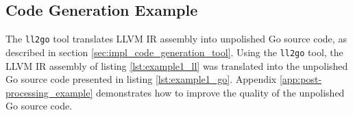
\subsection{Code Generation Example}

The \texttt{ll2go} tool translates LLVM IR assembly into unpolished Go source code, as described in section \ref{sec:impl_code_generation_tool}. Using the \texttt{ll2go} tool, the LLVM IR assembly of listing \ref{lst:example1_ll} was translated into the unpolished Go source code presented in listing \ref{lst:example1_go}. Appendix \ref{app:post-processing_example} demonstrates how to improve the quality of the unpolished Go source code.


